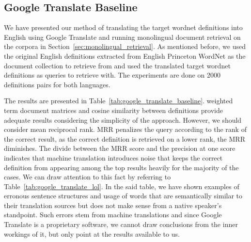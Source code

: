 
\subsection{Google Translate Baseline}%
\label{sub:chap4_results}

We have presented our method of translating the target wordnet definitions into English using Google Translate and running monolingual document retrieval on the corpora in Section~\ref{sec:monolingual_retrieval}.
As mentioned before, we used the original English definitions extracted from English Princeton WordNet as the document collection to retrieve from and used the translated target wordnet definitions as queries to retrieve with.
The experiments are done on 2000 definitions pairs for both languages.

The results are presented in Table~\ref{tab:google_translate_baseline}.
\tfidf{} weighted term document matrices and cosine similarity between definitions provide adequate results considering the simplicity of the approach.
However, we should consider mean reciprocal rank.
MRR penalizes the query according to the rank of the correct result, as the correct definition is retrieved on a lower rank, the MRR diminishes.
The divide between the MRR score and the precision at one score indicates that machine translation introduces noise that keeps the correct definition from appearing among the top results heavily for the majority of the cases.
We can draw attention to this fact by referring to Table~\ref{tab:google_translate_lol}.
In the said table, we have shown examples of erronous sentence structures and usage of words that are semantically similar to their translation sources but does not make sense from a native speaker's standpoint.
Such errors stem from machine translations and since Google Translate is a proprietary software, we cannot draw conclusions from the inner workings of it, but only point at the results available to us.

